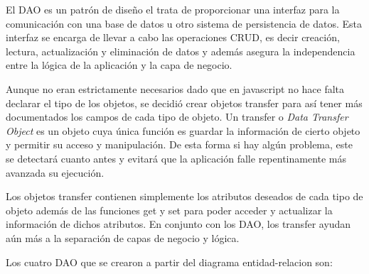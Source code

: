 \documentclass[11pt]{article}
\begin{document}
El DAO es un patrón de diseño el trata de proporcionar una interfaz para la comunicación con una base de datos u otro sistema de persistencia de datos. Esta interfaz se encarga de llevar a cabo las operaciones CRUD, es decir creación, lectura, actualización y eliminación de datos y además asegura la independencia entre la lógica de la aplicación y la capa de negocio.

Aunque no eran estrictamente necesarios dado que en javascript no hace falta declarar el tipo de los objetos, se decidió crear objetos transfer para así tener más documentados los campos de cada tipo de objeto.
Un transfer o \emph{Data Transfer Object} es un objeto cuya única función es guardar la información de cierto objeto y permitir su acceso y manipulación.
De esta forma si hay algún problema, este se detectará cuanto antes y evitará que la aplicación falle repentinamente más avanzada su ejecución.

Los objetos transfer contienen simplemente los atributos deseados de cada tipo de objeto además de las funciones get y set para poder acceder y actualizar la información de dichos atributos.
En conjunto con los DAO, los transfer ayudan aún más a la separación de capas de negocio y lógica.

Los cuatro DAO que se crearon a partir del diagrama entidad-relacion son:
\end{document}
